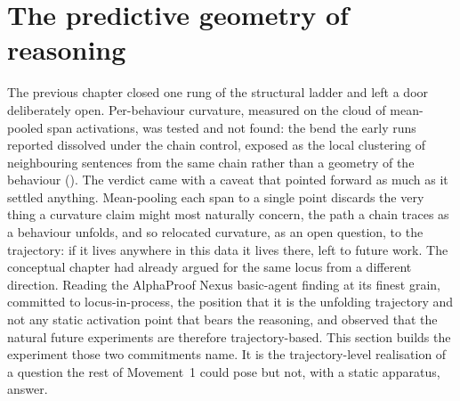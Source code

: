 %
%
\section{The predictive geometry of reasoning}\label{sec:predictive-geometry}

The previous chapter closed one rung of the structural ladder and left a door
deliberately open. Per-behaviour curvature, measured on the cloud of mean-pooled
span activations, was tested and not found: the bend the early runs reported
dissolved under the chain control, exposed as the local clustering of
neighbouring sentences from the same chain rather than a geometry of the
behaviour (). The verdict came with a caveat that pointed
forward as much as it settled anything. Mean-pooling each span to a single point
discards the very thing a curvature claim might most naturally concern, the path
a chain traces as a behaviour unfolds, and so  relocated
curvature, as an open question, to the trajectory: if it lives anywhere in this
data it lives there, left to future work. The conceptual chapter had already
argued for the same locus from a different direction. Reading the AlphaProof
Nexus basic-agent finding at its finest grain,  committed to
locus-in-process, the position that it is the unfolding trajectory and not any
static activation point that bears the reasoning, and observed that the natural
future experiments are therefore trajectory-based. This section builds the
experiment those two commitments name. It is the trajectory-level realisation of
a question the rest of Movement~1 could pose but not, with a static apparatus,
answer.

